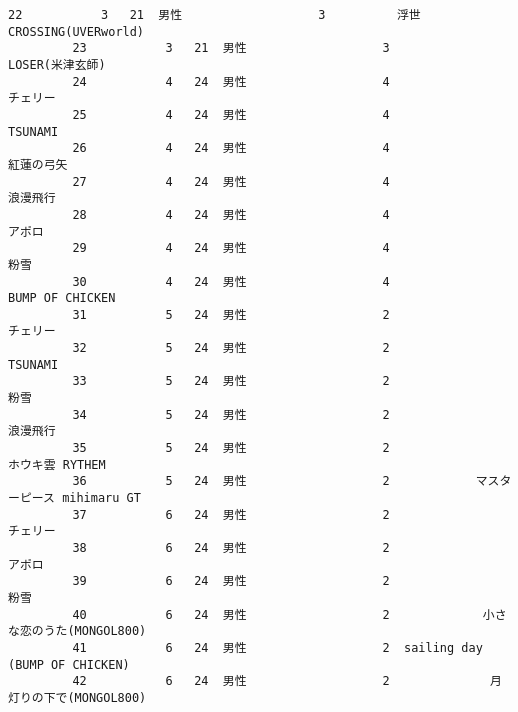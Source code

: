 \documentclass[11pt]{article}
\begin{document}
\begin{Verbatim}[commandchars=\\\{\}]
         22           3   21  男性                   3          浮世CROSSING(UVERworld)   
         23           3   21  男性                   3                    LOSER(米津玄師)   
         24           4   24  男性                   4                           チェリー   
         25           4   24  男性                   4                        TSUNAMI   
         26           4   24  男性                   4                          紅蓮の弓矢   
         27           4   24  男性                   4                           浪漫飛行   
         28           4   24  男性                   4                            アポロ   
         29           4   24  男性                   4                             粉雪   
         30           4   24  男性                   4                BUMP OF CHICKEN   
         31           5   24  男性                   2                           チェリー   
         32           5   24  男性                   2                        TSUNAMI   
         33           5   24  男性                   2                             粉雪   
         34           5   24  男性                   2                           浪漫飛行   
         35           5   24  男性                   2                    ホウキ雲 RYTHEM   
         36           5   24  男性                   2            マスターピース mihimaru GT   
         37           6   24  男性                   2                           チェリー   
         38           6   24  男性                   2                            アポロ   
         39           6   24  男性                   2                             粉雪   
         40           6   24  男性                   2             小さな恋のうた(MONGOL800)   
         41           6   24  男性                   2  sailing day (BUMP OF CHICKEN)   
         42           6   24  男性                   2              月灯りの下で(MONGOL800)   
         

\end{Verbatim}
\end{document}
